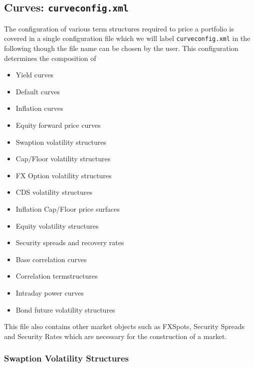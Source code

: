 \subsection{Curves: {\tt curveconfig.xml}}\label{sec:curveconfig}

The configuration of various term structures required to price a portfolio is covered in a single configuration file
which we will label {\tt curveconfig.xml} in the following though the file name can be chosen by the user. This
configuration determines the composition of
\begin{itemize}
\item Yield curves %
\item Default curves %
\item Inflation curves %
\item Equity forward price curves %
\item Swaption volatility structures %
\item Cap/Floor volatility structures %
\item FX Option volatility structures %
\item CDS volatility structures %
\item Inflation Cap/Floor price surfaces %
\item Equity volatility structures %
\item Security spreads and recovery rates %
\item Base correlation curves %
\item Correlation termstructures %
\item Intraday power curves
\item Bond future volatility structures %
\end{itemize}

This file also contains other market objects such as FXSpots, Security Spreads and Security Rates which are necessary
for the construction of a market.





\subsubsection{Swaption Volatility Structures}
\label{sss:swaptionconfig}

